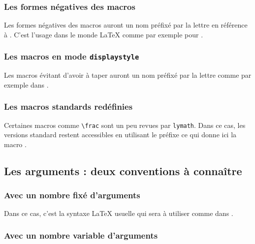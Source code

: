 \documentclass[12pt,a4paper]{article}
\begin{document}


\subsubsection{Les formes \og négatives \fg{} des macros}

Les formes \og négatives \fg{} des macros auront un nom préfixé par la lettre  en référence à . C'est l'usage dans le monde \LaTeX{} comme par exemple pour . 




\subsubsection{Les macros en mode \texttt{displaystyle}}

Les macros évitant d'avoir à taper  auront un nom préfixé par la lettre  comme par exemple dans .




\subsubsection{Les macros standards redéfinies}

Certaines macros comme \verb+\frac+ sont un peu revues par \verb+lymath+.
Dans ce cas, les versions standard restent accessibles en utilisant le préfixe  ce qui donne ici la macro .




\subsection{Les arguments : deux conventions à connaître}

\subsubsection{Avec un nombre fixé d'arguments}

Dans ce cas, c'est la syntaxe \LaTeX{} usuelle qui sera à utiliser comme dans .




\subsubsection{Avec un nombre variable d'arguments}
\end{document}
